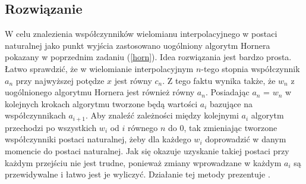 \documentclass[11pt]{mk-polish-lab-report}
\begin{document}
\subsection{Rozwiązanie}

W celu znalezienia współczynników wielomianu interpolacyjnego w postaci naturalnej jako punkt wyjścia zastosowano uogólniony algorytm Hornera pokazany w poprzednim zadaniu (\ref{horn}). Idea rozwiązania jest bardzo prosta. Łatwo sprawdzić, że w wielomianie interpolacyjnym $n$-tego stopnia współczynnik $a_n$ przy najwyższej potędze $x$ jest równy $c_n$. Z tego faktu wynika także, że  $w_n$ z uogólnionego algorytmu Hornera jest również równy $a_n$. Posiadając $a_n$ = $w_n$ w kolejnych krokach algorytmu tworzone będą wartości $a_i$ bazujące na współczynnikach $a_{i+1}$. Aby znaleźć zależności między kolejnymi $a_i$ algorytm przechodzi po wszystkich $w_i$ od $i$ równego $n$ do $0$, tak zmieniając tworzone współczynniki postaci naturalnej, żeby dla każdego $w_i$ doprowadzić w danym momencie do postaci naturalnej. Jak się okazuje uzyskanie takiej postaci przy każdym przejściu nie jest trudne, ponieważ zmiany wprowadzane w każdym $a_i$ są przewidywalne i łatwo jest je wyliczyć. Działanie tej metody prezentuje .
\end{document}

